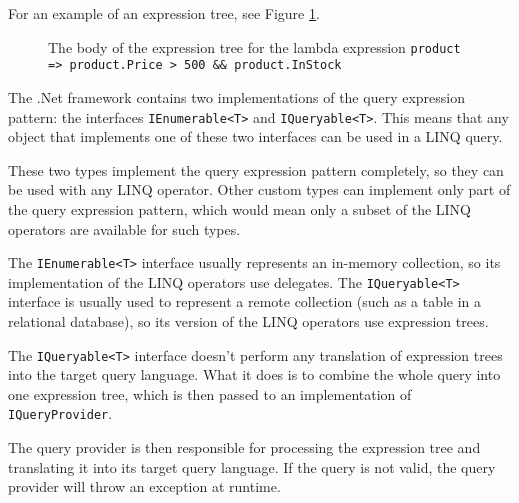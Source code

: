 For an example of an expression tree, see Figure \ref{Expression tree}.

\begin{figure}[htbp]
\begin{center}
\end{center}

\caption[Example body of expression tree]
{The body of the expression tree for the lambda expression \lstinline,product => product.Price > 500 && product.InStock,}
\label{Expression tree}
\end{figure}

The .Net framework contains two implementations of the query expression pattern:
the interfaces \lstinline,IEnumerable<T>, and \lstinline,IQueryable<T>,.
This means that any object that implements one of these two interfaces can be used in a LINQ query.

These two types implement the query expression pattern completely,
so they can be used with any LINQ operator.
Other custom types can implement only part of the query expression pattern,
which would mean only a subset of the LINQ operators are available for such types.

The \lstinline,IEnumerable<T>, interface usually represents an in-memory collection,
so its implementation of the LINQ operators use delegates.
The \lstinline,IQueryable<T>, interface is usually used to represent a remote collection
(such as a table in a relational database),
so its version of the LINQ operators use expression trees.

The \lstinline,IQueryable<T>, interface doesn't perform any translation of expression trees
into the target query language.
What it does is to combine the whole query into one expression tree,
which is then passed to an implementation of \lstinline,IQueryProvider,.

The query provider is then responsible for processing the expression tree
and translating it into its target query language.
If the query is not valid, the query provider will throw an exception at runtime.